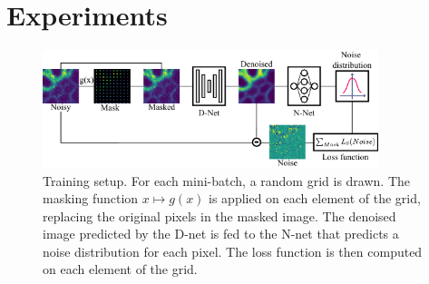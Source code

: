 \documentclass{article}
\begin{document}






\section{Experiments}
\begin{figure}[!htbp]
\vskip -0.1in
\begin{center}
\centerline{\includegraphics[width=3.85in]{fig_plomberie_1col.pdf}}
\caption{Training setup.
For each mini-batch, a random grid is drawn.
The masking function $x\mapsto g(x)$ is applied on each element of the grid, replacing the original pixels in the masked image.
The denoised image predicted by the D-net is fed to the N-net that predicts a noise distribution for each pixel.
The loss function is then computed on each element of the grid.
}
\label{fig:plumbing}
\end{center}
\end{figure}
\end{document}
